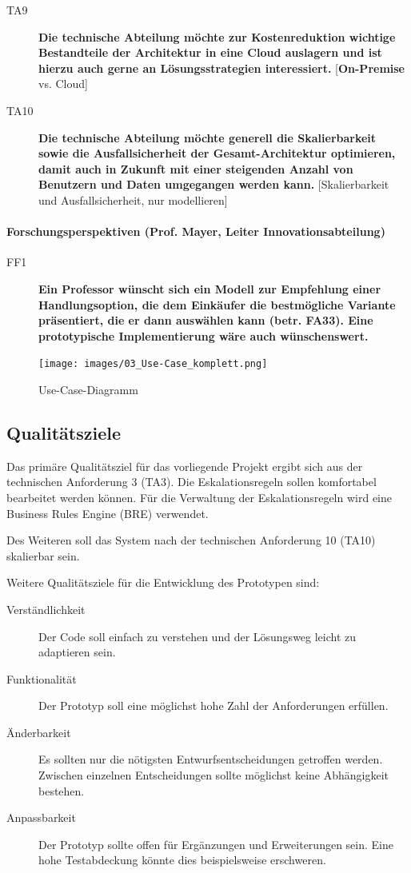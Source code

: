 \begin{description}
  \item[TA9] \textbf{Die technische Abteilung möchte zur Kostenreduktion wichtige Bestandteile der Architektur in eine Cloud auslagern und ist hierzu auch gerne an Lösungsstrategien interessiert.} [\textbf{On-Premise} vs. Cloud]
  \item[TA10] \textbf{Die technische Abteilung möchte generell die Skalierbarkeit sowie die Ausfallsicherheit der Gesamt-Architektur optimieren, damit auch in Zukunft mit einer steigenden Anzahl von Benutzern und Daten umgegangen werden kann.} [Skalierbarkeit und Ausfallsicherheit, nur modellieren]
\end{description}

\paragraph{Forschungsperspektiven (Prof. Mayer, Leiter Innovationsabteilung)}

\begin{description}
  \item[FF1] \textbf{Ein Professor wünscht sich ein Modell zur Empfehlung einer Handlungsoption, die dem Einkäufer die bestmögliche Variante präsentiert, die er dann auswählen kann (betr. FA33). Eine prototypische Implementierung wäre auch wünschenswert.}
\end{description}

\begin{figure}
  \centering
  \texttt{[image: images/03\_Use-Case\_komplett.png]}
  \caption{Use-Case-Diagramm}
  \label{fig:03_Use-Case_Ausschnitt}
\end{figure}

\subsection{Qualitätsziele}\label{_qualitaetsziele}

Das primäre Qualitätsziel für das vorliegende Projekt ergibt sich aus der technischen Anforderung 3 (TA3). Die Eskalationsregeln sollen komfortabel bearbeitet werden können. Für die Verwaltung der Eskalationsregeln wird eine Business Rules Engine (BRE) verwendet.

Des Weiteren soll das System nach der technischen Anforderung 10 (TA10) skalierbar sein.

Weitere Qualitätsziele für die Entwicklung des Prototypen sind:
\begin{description}
  \item[Verständlichkeit] Der Code soll einfach zu verstehen und der Lösungsweg leicht zu adaptieren sein.
  \item[Funktionalität] Der Prototyp soll eine möglichst hohe Zahl der Anforderungen erfüllen.
  \item[Änderbarkeit] Es sollten nur die nötigsten Entwurfsentscheidungen getroffen werden. Zwischen einzelnen Entscheidungen sollte möglichst keine Abhängigkeit bestehen.
  \item[Anpassbarkeit] Der Prototyp sollte offen für Ergänzungen und Erweiterungen sein. Eine hohe Testabdeckung könnte dies beispielsweise erschweren.
\end{description}

